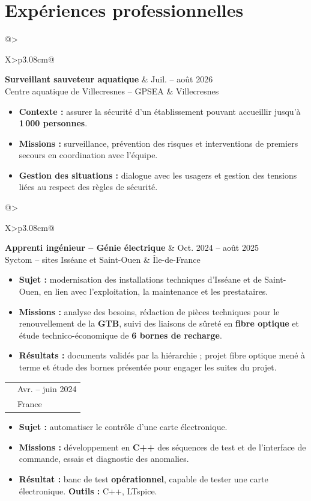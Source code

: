 \documentclass[9pt,a4paper]{extarticle}
\makeatletter
\newcommand{\entry}[4]{%
\begin{tabularx}{\linewidth}{@{}>{\raggedright\arraybackslash}X>{\raggedleft\arraybackslash}p{3.08cm}@{}}
 {\bfseries\color{bleu}#1} & {\fontsize{8.5}{9.3}\selectfont\color{secondaire}#2} \\[-2pt]
 {\fontsize{8.5}{9.6}\selectfont\color{secondaire}#3} & {\fontsize{8.5}{9.3}\selectfont\color{secondaire}#4}
\end{tabularx}\vspace{-2.6pt}\par}
\newcommand{\gapentry}{\vspace{2.4pt}}
\makeatother
\begin{document}
\section{Expériences professionnelles}
\entry{Surveillant sauveteur aquatique}{Juil. -- août 2026}{Centre aquatique de Villecresnes -- GPSEA}{Villecresnes}
\begin{itemize}
  \item \textbf{Contexte :} assurer la sécurité d'un établissement pouvant accueillir jusqu'à \textbf{1\,000 personnes}.
  \item \textbf{Missions :} surveillance, prévention des risques et interventions de premiers secours en coordination avec l'équipe.
  \item \textbf{Gestion des situations :} dialogue avec les usagers et gestion des tensions liées au respect des règles de sécurité.
\end{itemize}
\gapentry
\entry{Apprenti ingénieur -- Génie électrique}{Oct. 2024 -- août 2025}{Syctom -- sites Isséane et Saint-Ouen}{Île-de-France}
\begin{itemize}
  \item \textbf{Sujet :} modernisation des installations techniques d'Isséane et de Saint-Ouen, en lien avec l'exploitation, la maintenance et les prestataires.
  \item \textbf{Missions :} analyse des besoins, rédaction de pièces techniques pour le renouvellement de la \textbf{GTB}, suivi des liaisons de sûreté en \textbf{fibre optique} et étude technico-économique de \textbf{6 bornes de recharge}.
  \item \textbf{Résultats :} documents validés par la hiérarchie ; projet fibre optique mené à terme et étude des bornes présentée pour engager les suites du projet.
\end{itemize}
\gapentry
\entry{Stagiaire technicien électronicien supérieur}{Avr. -- juin 2024}{Cobham Aerospace Communications}{France}
\begin{itemize}
  \item \textbf{Sujet :} automatiser le contrôle d'une carte électronique.
  \item \textbf{Missions :} développement en \textbf{C++} des séquences de test et de l'interface de commande, essais et diagnostic des anomalies.
  \item \textbf{Résultat :} banc de test \textbf{opérationnel}, capable de tester une carte électronique. \textbf{Outils :} C++, LTspice.
\end{itemize}
\end{document}
